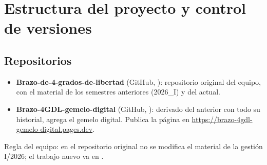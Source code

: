 \chapter{Estructura del proyecto y control de versiones}\label{cap:proyecto}

\section{Repositorios}
\begin{itemize}
\item \textbf{Brazo-de-4-grados-de-libertad} (GitHub, ): repositorio original del equipo, con el material de los semestres anteriores (2026\_I) y del actual.
\item \textbf{Brazo-4GDL-gemelo-digital} (GitHub, ): derivado del anterior con todo su historial, agrega el gemelo digital. Publica la página en \url{https://brazo-4gdl-gemelo-digital.pages.dev}.
\end{itemize}
Regla del equipo: en el repositorio original no se modifica el material de la gestión I/2026; el trabajo nuevo va en .

